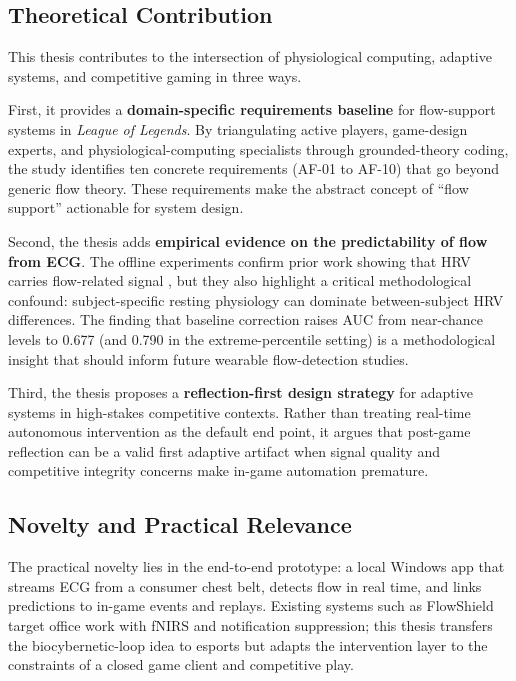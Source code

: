 \subsection{Theoretical Contribution}

This thesis contributes to the intersection of physiological computing, adaptive systems, and competitive gaming in three ways.

First, it provides a \textbf{domain-specific requirements baseline} for flow-support systems in \textit{League of Legends}. By triangulating active players, game-design experts, and physiological-computing specialists through grounded-theory coding, the study identifies ten concrete requirements (AF-01 to AF-10) that go beyond generic flow theory. These requirements make the abstract concept of \enquote{flow support} actionable for system design.

Second, the thesis adds \textbf{empirical evidence on the predictability of flow from ECG}. The offline experiments confirm prior work showing that HRV carries flow-related signal \autocite{9296229}, but they also highlight a critical methodological confound: subject-specific resting physiology can dominate between-subject HRV differences. The finding that baseline correction raises AUC from near-chance levels to 0.677 (and 0.790 in the extreme-percentile setting) is a methodological insight that should inform future wearable flow-detection studies.

Third, the thesis proposes a \textbf{reflection-first design strategy} for adaptive systems in high-stakes competitive contexts. Rather than treating real-time autonomous intervention as the default end point, it argues that post-game reflection can be a valid first adaptive artifact when signal quality and competitive integrity concerns make in-game automation premature.

\subsection{Novelty and Practical Relevance}

The practical novelty lies in the end-to-end prototype: a local Windows app that streams ECG from a consumer chest belt, detects flow in real time, and links predictions to in-game events and replays. Existing systems such as FlowShield \autocite{ubt_eref88160} target office work with fNIRS and notification suppression; this thesis transfers the biocybernetic-loop idea to esports but adapts the intervention layer to the constraints of a closed game client and competitive play.

